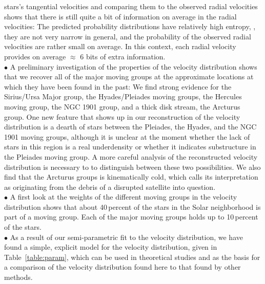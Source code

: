 stars's tangential velocities and comparing them to the observed
radial velocities shows that there is still quite a bit of information
on average in the radial velocities: The predicted probability
distributions have relatively high entropy, \ie, they are not very
narrow in general, and the probability of the observed radial
velocities are rather small on average. In this context, each radial
velocity provides on average $\approx$ 6 bits of extra
information.\\$\bullet$ A preliminary investigation of the properties
of the velocity distribution shows that we recover all of the major
moving groups at the approximate locations at which they have been
found in the past: We find strong evidence for the Sirius/Ursa Major
group, the Hyades/Pleiades moving groups, the Hercules moving group,
the NGC 1901 group, and a thick disk stream, the Arcturus group. One
new feature that shows up in our reconstruction of the velocity
distribution is a dearth of stars between the Pleiades, the Hyades,
and the NGC 1901 moving groups, although it is unclear at the moment
whether the lack of stars in this region is a real underdensity or
whether it indicates substructure in the Pleiades moving group. A more
careful analysis of the reconstructed velocity distribution is
necessary to to distinguish between these two possibilities. We also
find that the Arcturus groups is kinematically cold, which calls its
interpretation as originating from the debris of a disrupted satellite
into question.\\ $\bullet$ A first look at the weights of the
different moving groups in the velocity distribution shows that about
40\,percent of the stars in the Solar neighborhood is part of a moving
group. Each of the major moving groups holds up to 10\,percent of the
stars.\\$\bullet$ As a result of our semi-parametric fit to the
velocity distribution, we have found a simple, explicit model for the
velocity distribution, given in Table~\ref{table:param}, which can be
used in theoretical studies and as the basis for a comparison of the
velocity distribution found here to that found by other methods.



